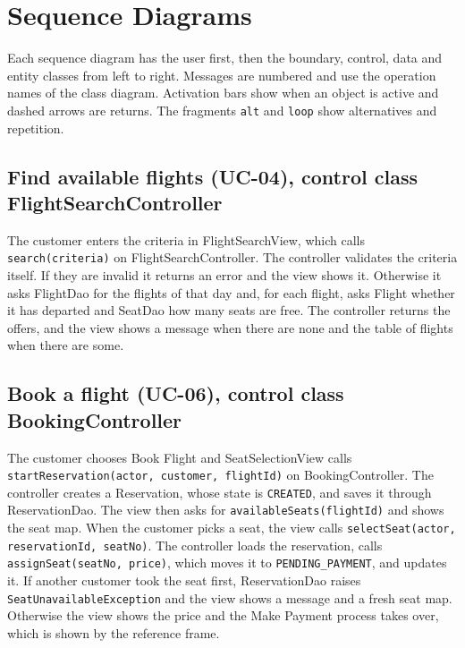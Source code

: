 \section{Sequence Diagrams}

Each sequence diagram has the user first, then the boundary, control, data and
entity classes from left to right. Messages are numbered and use the operation
names of the class diagram. Activation bars show when an object is active and
dashed arrows are returns. The fragments \texttt{alt} and \texttt{loop} show
alternatives and repetition.

\subsection*{Find available flights (UC-04), control class FlightSearchController}

The customer enters the criteria in FlightSearchView, which calls
\texttt{search(criteria)} on FlightSearchController. The controller validates
the criteria itself. If they are invalid it returns an error and the view shows
it. Otherwise it asks FlightDao for the flights of that day and, for each
flight, asks Flight whether it has departed and SeatDao how many seats are
free. The controller returns the offers, and the view shows a message when
there are none and the table of flights when there are some.


\subsection*{Book a flight (UC-06), control class BookingController}

The customer chooses Book Flight and SeatSelectionView calls
\texttt{startReservation(actor, customer, flightId)} on BookingController. The
controller creates a Reservation, whose state is \texttt{CREATED}, and saves it
through ReservationDao. The view then asks for \texttt{availableSeats(flightId)}
and shows the seat map. When the customer picks a seat, the view calls
\texttt{selectSeat(actor, reservationId, seatNo)}. The controller loads the
reservation, calls \texttt{assignSeat(seatNo, price)}, which moves it to
\texttt{PENDING\_PAYMENT}, and updates it. If another customer took the seat
first, ReservationDao raises \texttt{SeatUnavailableException} and the view
shows a message and a fresh seat map. Otherwise the view shows the price and
the Make Payment process takes over, which is shown by the reference frame.

